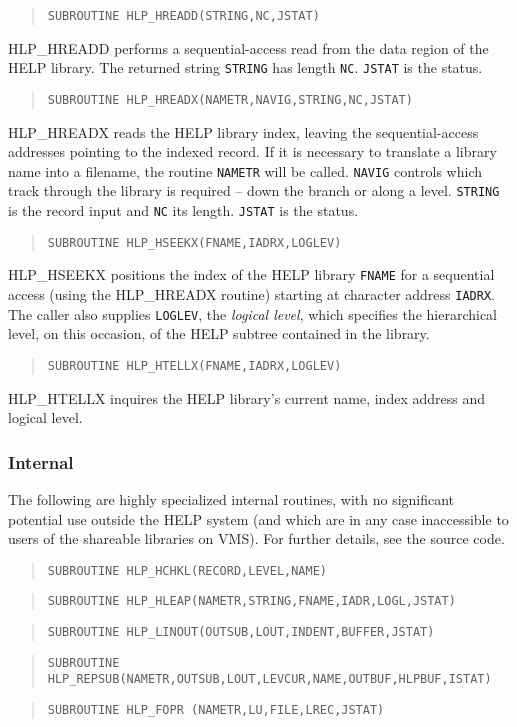 \begin{verse}
\verb|SUBROUTINE HLP_HREADD(STRING,NC,JSTAT)|
\end{verse}
HLP\_HREADD performs a sequential-access read from the data
region of the HELP library.  The returned string
\verb|STRING| has length \verb|NC|.  \verb|JSTAT| is the status.

\begin{verse}
\verb|SUBROUTINE HLP_HREADX(NAMETR,NAVIG,STRING,NC,JSTAT)|
\end{verse}
HLP\_HREADX reads the HELP library index, leaving
the sequential-access addresses pointing to the indexed record.
If it is necessary to translate a library name into a filename,
the routine \verb|NAMETR| will be called.
\verb|NAVIG| controls which track through the library is
required -- down the branch or along a level.  \verb|STRING| is
the record input and \verb|NC| its length.  \verb|JSTAT| is the
status.

\begin{verse}
\verb|SUBROUTINE HLP_HSEEKX(FNAME,IADRX,LOGLEV)|
\end{verse}
HLP\_HSEEKX positions the index of the HELP library \verb|FNAME|
for a sequential
access (using the HLP\_HREADX routine) starting at character address
\verb|IADRX|.  The caller also supplies \verb|LOGLEV|,
the {\it logical level}, which specifies the hierarchical level,
on this occasion, of the HELP subtree contained in the library.

\begin{verse}
\verb|SUBROUTINE HLP_HTELLX(FNAME,IADRX,LOGLEV)|
\end{verse}
HLP\_HTELLX inquires the HELP library's current name, index address
and logical level.

\subsubsection{Internal}
The following are highly specialized internal routines, with no
significant potential use outside the HELP system (and which
are in any case
inaccessible to users of the shareable libraries on VMS).
For further details, see the source code.
\begin{verse}
\verb|SUBROUTINE HLP_HCHKL(RECORD,LEVEL,NAME)|
\end{verse}
\begin{verse}
\verb|SUBROUTINE HLP_HLEAP(NAMETR,STRING,FNAME,IADR,LOGL,JSTAT)|
\end{verse}
\begin{verse}
\verb|SUBROUTINE HLP_LINOUT(OUTSUB,LOUT,INDENT,BUFFER,JSTAT)|
\end{verse}
\begin{verse}
\verb|SUBROUTINE HLP_REPSUB(NAMETR,OUTSUB,LOUT,LEVCUR,NAME,OUTBUF,HLPBUF,ISTAT)|
\end{verse}
\begin{verse}
\verb|SUBROUTINE HLP_FOPR (NAMETR,LU,FILE,LREC,JSTAT)|
\end{verse}

